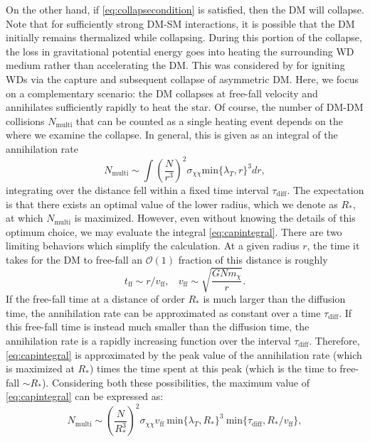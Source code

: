\documentclass[preprintnumbers,amsmath,amssymb,prd,superscriptaddress]{revtex4}
\newcommand{\OO}{\mathcal{O}}
\def\r{\right)}
\def\l{\left(}
\begin{document}
On the other hand, if \eqref{eq:collapsecondition} is satisfied, then the DM will collapse.   
Note that for sufficiently strong DM-SM interactions, it is possible that the DM initially remains thermalized while collapsing.
During this portion of the collapse, the loss in gravitational potential energy goes into heating the surrounding WD medium rather than accelerating the DM. 
This was considered by \cite{Bramante} for igniting WDs via the capture and subsequent collapse of asymmetric DM.
Here, we focus on a complementary scenario: the DM collapses at free-fall velocity and annihilates sufficiently rapidly to heat the star. 
Of course, the number of DM-DM collisions $N_\text{multi}$ that can be counted as a single heating event depends on the where we examine the collapse. 
In general, this is given as an integral of the annihilation rate
\begin{equation}
\label{eq:capintegral}
N_\text{multi} \sim \int \l \frac{N}{r^3}\r^2 \sigma_{\chi \chi} \text{min}\{\lambda_T, r\}^3 dr,
\end{equation}
integrating over the distance fell within a fixed time interval $\tau_\text{diff}$. 
The expectation is that there exists an optimal value of the lower radius, which we denote as $R_*$, at which $N_\text{multi}$ is maximized. 
However, even without knowing the details of this optimum choice, we may evaluate the integral \eqref{eq:capintegral}. 
There are two limiting behaviors which simplify the calculation. 
At a given radius $r$, the time it takes for the DM to free-fall an $\OO(1)$ fraction of this distance is roughly
\begin{equation}
t_\text{ff} \sim r/v_\text{ff}, ~~~~ v_\text{ff} \sim \sqrt{\frac{G N m_\chi}{r}}. 
\end{equation}
If the free-fall time at a distance of order $R_*$ is much larger than the diffusion time, the annihilation rate can be approximated as constant over a time $\tau_\text{diff}$.
If this free-fall time is instead much smaller than the diffusion time, the annihilation rate is a rapidly increasing function over the interval $\tau_\text{diff}$.
Therefore, \eqref{eq:capintegral} is approximated by the peak value of the annihilation rate (which is maximized at $R_*$) times the time spent at this peak (which is the time to free-fall $\sim R_*$).
Considering both these possibilities, the maximum value of \eqref{eq:capintegral} can be expressed as:
\begin{equation}
N_\text{multi} \sim \l \frac{N}{R_*^3}\r^2  \sigma_{\chi \chi} v_\text{ff} ~\text{min}\{\lambda_T, R_*\}^3 ~\text{min}\{\tau_\text{diff}, R_*/v_\text{ff}\},
\end{equation}
\end{document}
